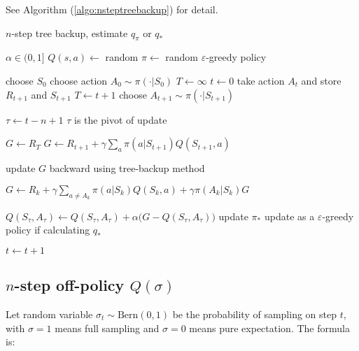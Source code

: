 See Algorithm (\ref{algo:nsteptreebackup}) for detail.


\begin{algorithm}
	\caption{$n$-step tree backup, estimate $q_\pi$ or $q_*$}\label{algo:nsteptreebackup}	
	
	\begin{algorithmic}[1]
		\State $ \alpha \in (0,1]$
		\State $Q(s,a) \gets$ random
		\State $\pi \gets$ random $\varepsilon$-greedy policy
				
		\Statex
		
		\Loop
			\State choose $S_0$
			\State choose action $A_0 \sim \pi (\cdot | S_0)$
			\State $T \gets \infty$
			\State $t \gets 0$
					\State take action $A_t$ and store $R_{t+1}$ and $S_{t+1}$
						\State $T \gets t+1$
					\Else
						\State choose $A_{t+1} \sim \pi(\cdot|S_{t+1})$
					\EndIf
				\EndIf
				
				\State $\tau \gets t - n + 1$ \Comment $\tau$ is the pivot of update
				
						\State $G \gets R_T$
					\Else
						\State $G \gets R_{t+1} + \gamma \sum\limits_a \pi(a|S_{t+1}) Q(S_{t+1},a)$
					\EndIf
					
					\State \Comment update $G$ backward using tree-backup method
					
						\State $G \gets R_k + \gamma \sum\limits_{a\neq A_k} \pi(a|S_k)Q(S_k,a) + \gamma \pi (A_k|S_k)G$
					\EndFor
					
					\State $Q(S_{\tau}, A_{\tau}) \gets Q(S_{\tau}, A_{\tau}) + \alpha  \Big(G - Q(S_{\tau}, A_{\tau})\Big)$
					\State update $\pi_*$ \Comment update as a $\varepsilon$-greedy policy if calculating $q_*$
				\EndIf

				\State $t \gets t+1$
			\EndWhile
		\EndLoop
	\end{algorithmic}
\end{algorithm}

\subsection{$n$-step off-policy $Q(\sigma )$}

Let random variable $\sigma_t \sim \text{Bern}(0,1)$ be the probability of sampling on step $t$, with $\sigma = 1$ means full sampling and $\sigma = 0$ means pure expectation. The formula is:

